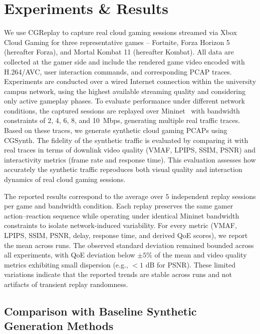 \section{Experiments \& Results}
\label{sec: experiment&result}
%
We use CGReplay to capture real cloud gaming sessions streamed via Xbox Cloud Gaming for three representative games -- Fortnite, Forza Horizon 5 (hereafter Forza), and Mortal Kombat 11 (hereafter Kombat).
%
All data are collected at the gamer side and include the rendered game video encoded with H.264/AVC, user interaction commands, and corresponding PCAP traces. Experiments are conducted over a wired Internet connection within the university campus network, using the highest available streaming quality and considering only active gameplay phases. To evaluate performance under different network conditions, the captured sessions are replayed over Mininet~\cite{fontes2015mininet} with bandwidth constraints of 2, 4, 6, 8, and 10~Mbps, generating multiple real traffic traces. Based on these traces, we generate synthetic cloud gaming PCAPs using CGSynth. The fidelity of the synthetic traffic is evaluated by comparing it with real traces in terms of downlink video quality (VMAF, LPIPS, SSIM, PSNR) and interactivity metrics (frame rate and response time). This evaluation assesses how accurately the synthetic traffic reproduces both visual quality and interaction dynamics of real cloud gaming sessions.

The reported results correspond to the average over $5$ independent replay sessions per game and bandwidth condition. Each replay preserves the same gamer action--reaction sequence while operating under identical Mininet bandwidth constraints to isolate network-induced variability. For every metric (VMAF, LPIPS, SSIM, PSNR, delay, response time, and derived QoE scores), we report the mean across runs. The observed standard deviation remained bounded across all experiments, with QoE deviation below $\pm 5\%$ of the mean and video quality metrics exhibiting small dispersion (e.g., $<1$ dB for PSNR). These limited variations indicate that the reported trends are stable across runs and not artifacts of transient replay randomness.


\subsection{Comparison with Baseline Synthetic Generation Methods}
\label{subsec:baseline_comparison}

